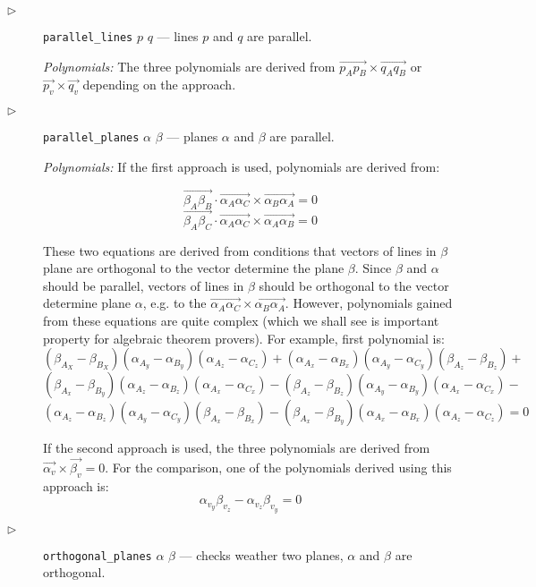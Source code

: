 \documentclass[final,1p,times,authoryear]{elsarticle}
\begin{document}
\begin{description}
\item[$\triangleright$] {\tt parallel\_lines} $p$ $q$ --- lines $p$
  and $q$ are parallel.

{\em Polynomials:} The three polynomials are derived from
$\overrightarrow{p_Ap_B} \times \overrightarrow{q_Aq_B}$ or
$\overrightarrow{p_v} \times \overrightarrow{q_v}$ depending on the
approach.

\item[$\triangleright$] {\tt parallel\_planes} $\alpha$ $\beta$ ---
  planes $\alpha$ and $\beta$ are parallel.

{\em Polynomials:} If the first approach is used, polynomials are
derived from:

$$\overrightarrow{\beta_A\beta_B}\cdot \overrightarrow{\alpha_A\alpha_C} \times \overrightarrow{\alpha_B\alpha_A} = 0$$
$$\overrightarrow{\beta_A\beta_C}\cdot \overrightarrow{\alpha_A\alpha_C} \times \overrightarrow{\alpha_A\alpha_B} = 0$$

These two equations are derived from conditions that vectors of lines
in $\beta$ plane are orthogonal to the vector determine the plane
$\beta$. Since $\beta$ and $\alpha$ should be parallel, vectors of
lines in $\beta$ should be orthogonal to the vector determine plane
$\alpha$, e.g. to the $\overrightarrow{\alpha_A\alpha_C} \times
\overrightarrow{\alpha_B\alpha_A}$. However, polynomials gained from
these equations are quite complex (which we shall see is important
property for algebraic theorem provers). For example, first polynomial
is:
$$(\beta_{A_X} - \beta_{B_X})(\alpha_{A_y} - \alpha_{B_y})(\alpha_{A_z} - \alpha_{C_z}) + (\alpha_{A_x} - \alpha_{B_x})(\alpha_{A_y} - \alpha_{C_y})(\beta_{A_z} - \beta_{B_z}) +$$
$$(\beta_{A_x} - \beta_{B_y})(\alpha_{A_z} - \alpha_{B_z})(\alpha_{A_x} - \alpha_{C_x}) - (\beta_{A_z} - \beta_{B_z})(\alpha_{A_y} - \alpha_{B_y})(\alpha_{A_x} - \alpha_{C_x}) -$$
$$(\alpha_{A_z} - \alpha_{B_z})(\alpha_{A_y} - \alpha_{C_y})(\beta_{A_x} - \beta_{B_x}) - (\beta_{A_x} - \beta_{B_y})(\alpha_{A_x} - \alpha_{B_x})(\alpha_{A_z} - \alpha_{C_z}) = 0$$

If the second approach is used, the three polynomials are derived from
$\overrightarrow{\alpha_v} \times \overrightarrow{\beta_v} = 0.$
For the comparison, one of the polynomials derived using this approach is:
$$\alpha_{v_y}\beta_{v_z} - \alpha_{v_z}\beta_{v_y} = 0$$


\item[$\triangleright$] {\tt orthogonal\_planes} $\alpha$ $\beta$ ---
  checks weather two planes, $\alpha$ and $\beta$ are orthogonal.


\end{description}
\end{document}
